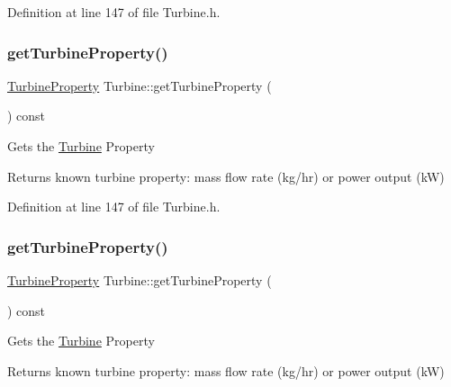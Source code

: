 Definition at line 147 of file Turbine.\+h.

\mbox{\label{class_turbine_a14f6eff49b501aa8c5a22d404dbeaac0}} 
\subsubsection{\texorpdfstring{get\+Turbine\+Property()}{getTurbineProperty()}\hspace{0.1cm}{\footnotesize\ttfamily [2/3]}}
{\footnotesize\ttfamily \hyperlink{class_turbine_a5db4f65cf2539e3837684d53221ade12}{Turbine\+Property} Turbine\+::get\+Turbine\+Property (\begin{DoxyParamCaption}{ }\end{DoxyParamCaption}) const\hspace{0.3cm}{\ttfamily [inline]}}

Gets the \hyperlink{class_turbine}{Turbine} Property

\begin{DoxyReturn}{Returns}
known turbine property\+: mass flow rate (kg/hr) or power output (kW) 
\end{DoxyReturn}


Definition at line 147 of file Turbine.\+h.

\mbox{\label{class_turbine_a14f6eff49b501aa8c5a22d404dbeaac0}} 
\subsubsection{\texorpdfstring{get\+Turbine\+Property()}{getTurbineProperty()}\hspace{0.1cm}{\footnotesize\ttfamily [3/3]}}
{\footnotesize\ttfamily \hyperlink{class_turbine_a5db4f65cf2539e3837684d53221ade12}{Turbine\+Property} Turbine\+::get\+Turbine\+Property (\begin{DoxyParamCaption}{ }\end{DoxyParamCaption}) const\hspace{0.3cm}{\ttfamily [inline]}}

Gets the \hyperlink{class_turbine}{Turbine} Property

\begin{DoxyReturn}{Returns}
known turbine property\+: mass flow rate (kg/hr) or power output (kW) 
\end{DoxyReturn}


